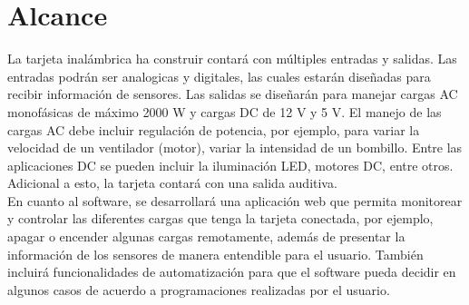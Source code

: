 \chapter{Alcance}

La tarjeta inalámbrica ha construir contará con múltiples entradas y salidas. Las entradas podrán ser analogicas y digitales, las cuales estarán diseñadas para recibir información de sensores. Las salidas se diseñarán para manejar cargas AC monofásicas de máximo 2000 W y cargas DC de 12 V y 5 V. El manejo de las cargas AC debe incluir regulación de potencia, por ejemplo, para variar la velocidad de un ventilador (motor), variar la intensidad de un bombillo. Entre las aplicaciones DC se pueden incluir la iluminación LED, motores DC, entre otros. Adicional a esto, la tarjeta contará con una salida auditiva.\\

En cuanto al software, se desarrollará una aplicación web que permita monitorear y controlar las diferentes cargas que tenga la tarjeta conectada, por ejemplo, apagar o encender algunas cargas remotamente, además de presentar la información de los sensores de manera entendible para el usuario. También incluirá funcionalidades de automatización para que el software pueda decidir en algunos casos de acuerdo a programaciones realizadas por el usuario.\\

